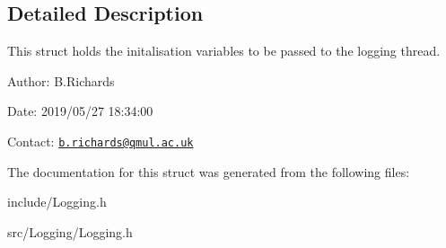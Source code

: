 \subsection{Detailed Description}
This struct holds the initalisation variables to be passed to the logging thread.

\begin{DoxyParagraph}{Author\-:}
B.\-Richards 
\end{DoxyParagraph}
\begin{DoxyParagraph}{Date\-:}
2019/05/27 18\-:34\-:00 
\end{DoxyParagraph}
Contact\-: \href{mailto:b.richards@qmul.ac.uk}{\tt b.\-richards@qmul.\-ac.\-uk} 

The documentation for this struct was generated from the following files\-:\begin{DoxyCompactItemize}
\item 
include/Logging.\-h\item 
src/\-Logging/Logging.\-h\end{DoxyCompactItemize}
